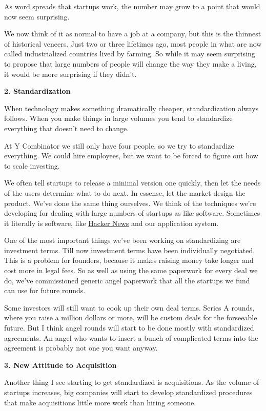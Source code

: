 As word spreads that startups work, the number may grow to a point that
would now seem surprising.

We now think of it as normal to have a job at a company, but this is the
thinnest of historical veneers. Just two or three lifetimes ago, most
people in what are now called industrialized countries lived by farming.
So while it may seem surprising to propose that large numbers of people
will change the way they make a living, it would be more surprising if
they didn't.

\textbf{2. Standardization}

When technology makes something dramatically cheaper, standardization
always follows. When you make things in large volumes you tend to
standardize everything that doesn't need to change.

At Y Combinator we still only have four people, so we try to standardize
everything. We could hire employees, but we want to be forced to figure
out how to scale investing.

We often tell startups to release a minimal version one quickly, then
let the needs of the users determine what to do next. In essense, let
the market design the product. We've done the same thing ourselves. We
think of the techniques we're developing for dealing with large numbers
of startups as like software. Sometimes it literally is software, like
\href{http://news.ycombinator.com}{Hacker News} and our application
system.

One of the most important things we've been working on standardizing are
investment terms. Till now investment terms have been individually
negotiated. This is a problem for founders, because it makes raising
money take longer and cost more in legal fees. So as well as using the
same paperwork for every deal we do, we've commissioned generic angel
paperwork that all the startups we fund can use for future rounds.

Some investors will still want to cook up their own deal terms. Series A
rounds, where you raise a million dollars or more, will be custom deals
for the forseeable future. But I think angel rounds will start to be
done mostly with standardized agreements. An angel who wants to insert a
bunch of complicated terms into the agreement is probably not one you
want anyway.

\textbf{3. New Attitude to Acquisition}

Another thing I see starting to get standardized is acquisitions. As the
volume of startups increases, big companies will start to develop
standardized procedures that make acquisitions little more work than
hiring someone.

